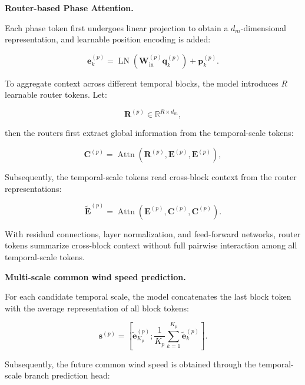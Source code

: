 \textbf{Router-based Phase Attention.}

Each phase token first undergoes linear projection to obtain a $d_m$-dimensional representation, and learnable position encoding is added:

\begin{equation}
\mathbf{e}^{(p)}_k = \operatorname{LN} \left( \mathbf{W}_{\mathrm{in}}^{(p)} \mathbf{q}^{(p)}_k \right) + \mathbf{p}^{(p)}_k.
\end{equation}

To aggregate context across different temporal blocks, the model introduces $R$ learnable router tokens. Let:

\begin{equation}
\mathbf{R}^{(p)} \in \mathbb{R}^{R\times d_m},
\end{equation}

then the routers first extract global information from the temporal-scale tokens:

\begin{equation}
\mathbf{C}^{(p)} = \operatorname{Attn} \left( \mathbf{R}^{(p)}, \mathbf{E}^{(p)}, \mathbf{E}^{(p)} \right),
\end{equation}

Subsequently, the temporal-scale tokens read cross-block context from the router representations:

\begin{equation}
\widetilde{\mathbf{E}}^{(p)} = \operatorname{Attn} \left( \mathbf{E}^{(p)}, \mathbf{C}^{(p)}, \mathbf{C}^{(p)} \right).
\end{equation}

With residual connections, layer normalization, and feed-forward networks, router tokens summarize cross-block context without full pairwise interaction among all temporal-scale tokens.

\textbf{Multi-scale common wind speed prediction.}

For each candidate temporal scale, the model concatenates the last block token with the average representation of all block tokens:

\begin{equation}
\mathbf{s}^{(p)} = \left[ \widetilde{\mathbf{e}}^{(p)}_{K_p}; \frac{1}{K_p} \sum_{k=1}^{K_p} \widetilde{\mathbf{e}}^{(p)}_k \right].
\end{equation}

Subsequently, the future common wind speed is obtained through the temporal-scale branch prediction head:

